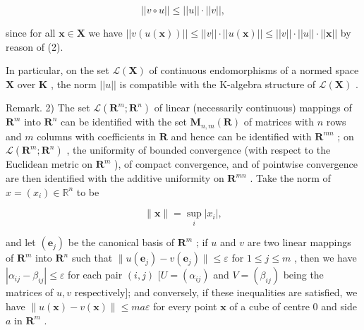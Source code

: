 \[
\left| \left| v \circ u \right| \right| \leqslant \left| \left| u \right| \right| \cdot \left| \left| v \right| \right|,\tag{3}
\]

since for all \(\pmb{x} \in \mathbf{X}\) we have \(||v(u(\pmb{x}))|| \leqslant ||v|| \cdot ||u(\pmb{x})|| \leqslant ||v|| \cdot ||u|| \cdot ||\pmb{x}||\) by reason of (2).

In particular, on the set \(\mathcal{L}(\mathbf{X})\) of continuous endomorphisms of a normed space \(\mathbf{X}\) over \(\mathbf{K}\) , the norm \(||u||\) is compatible with the K-algebra structure of \(\mathcal{L}(\mathbf{X})\) .

Remark. 2) The set \(\mathcal{L}(\mathbf{R}^{m};\mathbf{R}^{n})\) of linear (necessarily continuous) mappings of \(\mathbf{R}^{m}\) into \(\mathbf{R}^{n}\) can be identified with the set \(\mathbf{M}_{n,m}(\mathbf{R})\) of matrices with \(n\) rows and \(m\) columns with coefficients in \(\mathbf{R}\) and hence can be identified with \(\mathbf{R}^{mn}\) ; on \(\mathcal{L}(\mathbf{R}^{m};\mathbf{R}^{n})\) , the uniformity of bounded convergence (with respect to the Euclidean metric on \(\mathbf{R}^{m}\) ), of compact convergence, and of pointwise convergence are then identified with the additive uniformity on \(\mathbf{R}^{mn}\) . Take the norm of \(x = (x_{i})\in \mathbb{R}^{n}\) to be

\[
\| \boldsymbol {x} \| = \sup _ {i} | x _ {i} |,
\]

and let \((\pmb{e}_j)\) be the canonical basis of \(\mathbf{R}^m\) ; if \(u\) and \(v\) are two linear mappings of \(\mathbf{R}^m\) into \(\mathbf{R}^n\) such that \(\| u(\pmb{e}_j) - v(\pmb{e}_j)\| \leqslant \varepsilon\) for \(1 \leqslant j \leqslant m\) , then we have \(|\alpha_{ij} - \beta_{ij}| \leqslant \varepsilon\) for each pair \((i,j)\) \([U = (\alpha_{ij})\) and \(V = (\beta_{ij})\) being the matrices of \(u, v\) respectively{]}; and conversely, if these inequalities are satisfied, we have \(\| u(\pmb{x}) - v(\pmb{x})\| \leqslant ma\varepsilon\) for every point \(\pmb{x}\) of a cube of centre 0 and side \(a\) in \(\mathbf{R}^m\) .

